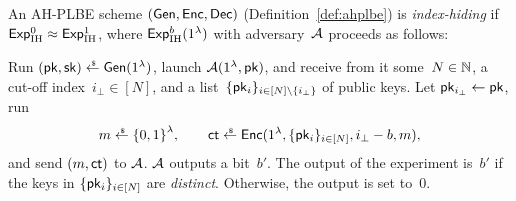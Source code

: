 \begin{definition}\label{def:ahplbe-index-hiding}
An AH-PLBE scheme $({\smash{\mathsf{Gen}}},{\smash{\mathsf{Enc}}},{\smash{\mathsf{Dec}}})$ (Definition~\ref{def:ahplbe})
is \emph{index-hiding} if ${{\smash{\mathsf{Exp}}_{\textup{IH}}^{0}}\approx{\smash{\mathsf{Exp}}_{\textup{IH}}^{1}}}$,
where ${\smash{\mathsf{Exp}}_{\textup{IH}}^{b}}(1^\lambda)$ with adversary~${\mathcal{A}}$ proceeds as follows:
\begin{security}
Run
${(\pk,\sk)\draws\Gen(1^\lambda)}$,
launch ${\mathcal{A}}(1^\lambda,{\smash{\mathsf{pk}}})$, and
receive from it
some~${N\in{\mathbb{N}}}$,
a cut-off index~${i_\bot\in[N]}$, and
a list~$\{\pk_i\}_{i\in[N]\setminus\{i_\bot\}}$ of public keys.
Let ${\pk_{i_\bot}\gets\pk}$,
run
\begin{align*}
m\draws\bit^\lambda,\qquad
\ct\draws\Enc(1^\lambda,\{\pk_i\}_{i\in[N]},i_\bot-b,m),
\end{align*}
and send $(m,{\smash{\mathsf{ct}}})$ to ${\mathcal{A}}$.
${\mathcal{A}}$ outputs a bit~$b'$.
The output of the experiment is~$b'$ if
the keys in $\{{\smash{\mathsf{pk}}}_i\}_{i\in[N]}$ are \emph{distinct}.
Otherwise, the output is set to~$0$.
\end{security}
\end{definition}
